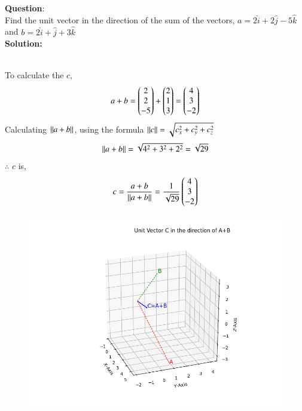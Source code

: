 \documentclass[journal]{IEEEtran}
\begin{document}
	
	\textbf{Question}:\\
	Find the unit vector in the direction of the sum of the vectors, $a=2\hat{i}+2\hat{j}-5\hat{k}$ and $b = 2\hat{i} + \hat{j} + 3\hat{k}$
	\\ \textbf{Solution: }\\
	\begin{table}[h!]    
		\centering
		
		\caption{}
	\end{table}\\
	To calculate the $c$,
	\begin{align}
		a+b = \begin{pmatrix}2 \\ 2 \\ -5\end{pmatrix} + \begin{pmatrix}2 \\ 1\\3\end{pmatrix}  = \begin{pmatrix}4 \\ 3\\-2\end{pmatrix}\label{eq1.1.10.26.1}
	\end{align}
	Calculating $\left\lVert a+b\right\rVert$, using the formula $\left\lVert c\right\rVert=\sqrt{c_x^2 + c_y^2 + c_z^2}$
	\begin{align}
		\left\lVert a+b\right\rVert = \sqrt{4^2 + 3^2 + 2^2}=\sqrt{29} \label{eq1.1.10.26.2}
	\end{align}
	$\therefore$ $c$ is,
	\begin{align}
		c = \frac{a+b}{\left\lVert a+b\right\rVert} = \frac{1}{\sqrt{29}}\begin{pmatrix}4 \\ 3\\-2\end{pmatrix} \label{eq1.1.10.26.3}
	\end{align}
	\begin{figure}[h]
		\centering
		\includegraphics[width=0.7\linewidth]{figs/fig1.png}
		\caption{}
		\label{graph}
	\end{figure}
	
	
	
\end{document}
